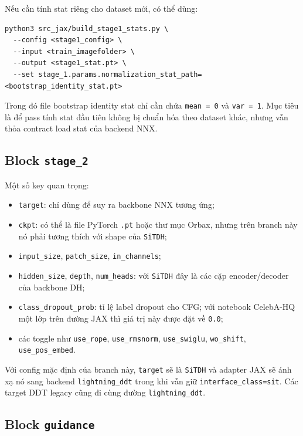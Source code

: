 Nếu cần tính stat riêng cho dataset mới, có thể dùng:

\begin{lstlisting}[style=rae]
python3 src_jax/build_stage1_stats.py \
  --config <stage1_config> \
  --input <train_imagefolder> \
  --output <stage1_stat.pt> \
  --set stage_1.params.normalization_stat_path=<bootstrap_identity_stat.pt>
\end{lstlisting}

Trong đó file bootstrap identity stat chỉ cần chứa \texttt{mean = 0} và
\texttt{var = 1}. Mục tiêu là để pass tính stat đầu tiên không bị chuẩn hóa theo
dataset khác, nhưng vẫn thỏa contract load stat của backend NNX.

\subsection{Block \texttt{stage\_2}}

Một số key quan trọng:

\begin{itemize}[leftmargin=1.5em]
  \item \texttt{target}: chỉ dùng để suy ra backbone NNX tương ứng;
  \item \texttt{ckpt}: có thể là file PyTorch \texttt{.pt} hoặc thư mục Orbax,
  nhưng trên branch này nó phải tương thích với shape của \texttt{SiTDH};
  \item \texttt{input\_size}, \texttt{patch\_size}, \texttt{in\_channels};
  \item \texttt{hidden\_size}, \texttt{depth}, \texttt{num\_heads}: với
  \texttt{SiTDH} đây là các cặp encoder/decoder của backbone DH;
  \item \texttt{class\_dropout\_prob}: tỉ lệ label dropout cho CFG; với
  notebook CelebA-HQ một lớp trên đường JAX thì giá trị này được đặt về
  \texttt{0.0};
  \item các toggle như \texttt{use\_rope}, \texttt{use\_rmsnorm},
  \texttt{use\_swiglu}, \texttt{wo\_shift}, \texttt{use\_pos\_embed}.
\end{itemize}

Với config mặc định của branch này, \texttt{target} sẽ là \texttt{SiTDH} và
adapter JAX sẽ ánh xạ nó sang backend \texttt{lightning\_ddt} trong khi vẫn giữ
\texttt{interface\_class=sit}. Các target DDT legacy cũng đi cùng đường
\texttt{lightning\_ddt}.

\subsection{Block \texttt{guidance}}

